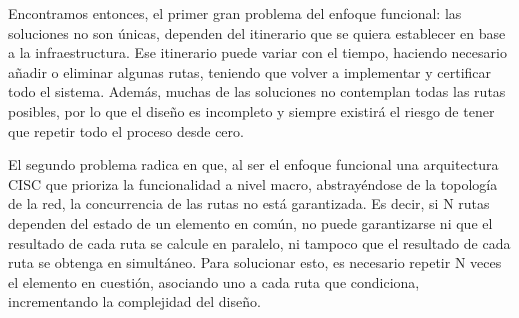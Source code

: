     \begin{table}[!h]
        {
        \caption{Tabla de enclavamientos completa.}
        \label{Tab:funcional_4}
        \centering
            \begin{center}
            \end{center}
        }    
    \end{table}
    
    Encontramos entonces, el primer gran problema del enfoque funcional: las soluciones no son únicas, dependen del itinerario que se quiera establecer en base a la infraestructura. Ese itinerario puede variar con el tiempo, haciendo necesario añadir o eliminar algunas rutas, teniendo que volver a implementar y certificar todo el sistema. Además, muchas de las soluciones no contemplan todas las rutas posibles, por lo que el diseño es incompleto y siempre existirá el riesgo de tener que repetir todo el proceso desde cero.

    El segundo problema radica en que, al ser el enfoque funcional una arquitectura CISC que prioriza la funcionalidad a nivel macro, abstrayéndose de la topología de la red, la concurrencia de las rutas no está garantizada. Es decir, si N rutas dependen del estado de un elemento en común, no puede garantizarse ni que el resultado de cada ruta se calcule en paralelo, ni tampoco que el resultado de cada ruta se obtenga en simultáneo. Para solucionar esto, es necesario repetir N veces el elemento en cuestión, asociando uno a cada ruta que condiciona, incrementando la complejidad del diseño. 
    
